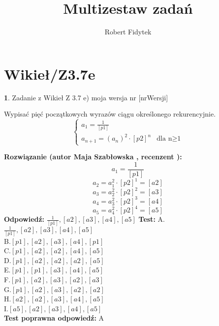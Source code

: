 \documentclass[12pt, a4paper]{article}
\title{Multizestaw zadań}
\author{Robert Fidytek}
\date{}
\theoremstyle{definition} %
\newtheorem{zad}{}
\newcommand{\kategoria}[1]{\section{#1}} %
\newcommand{\zadStart}[1]{\begin{zad}#1\newline} %
\newcommand{\zadStop}{\end{zad}}   %
\newcommand{\rozwStart}[2]{\noindent \textbf{Rozwiązanie (autor #1 , recenzent #2): }\newline} %
\newcommand{\rozwStop}{\newline}                                            %
\newcommand{\odpStart}{\noindent \textbf{Odpowiedź:}\newline}    %
\newcommand{\odpStop}{\newline}                                             %
\newcommand{\testStart}{\noindent \textbf{Test:}\newline} %
\newcommand{\testStop}{\newline} %
\newcommand{\kluczStart}{\noindent \textbf{Test poprawna odpowiedź:}\newline} %
\newcommand{\kluczStop}{\newline} %
\begin{document}
\maketitle


\kategoria{Wikieł/Z3.7e}
\zadStart{Zadanie z Wikieł Z 3.7 e)  moja wersja nr [nrWersji]}

Wypisać pięć początkowych wyrazów ciągu określonego rekurencyjnie.
$$\left\{ \begin{array}{ll}
a_{1}=\frac{1}{[p1]}\\
a_{n+1}=(a_{n})^{2}\cdot[p2]^{n}& \textrm{dla n$\geq$1} 
\end{array} \right.
$$
\zadStop
\rozwStart{Maja Szabłowska}{}
$$a_{1}=\frac{1}{[p1]}$$
$$a_{2}=a_{1}^{2}\cdot [p2]^{1}=[a2]$$
$$a_{3}=a_{2}^{2}\cdot [p2]^{2}=[a3]$$
$$a_{4}=a_{3}^{2}\cdot [p2]^{3}=[a4]$$
$$a_{5}=a_{4}^{2}\cdot [p2]^{4}=[a5]$$
\rozwStop
\odpStart
$\frac{1}{[p1]},[a2],[a3],[a4],[a5]$
\odpStop
\testStart
A.$\frac{1}{[p1]},[a2],[a3],[a4],[a5]$\\
B.$[p1],[a2],[a3],[a4],[p1]$\\
C.$[p1],[a2],[a2],[a4],[a5]$\\
D.$[p1],[a2],[a2],[a2],[a5]$\\
E.$[p1],[p1],[a3],[a4],[a5]$\\
F.$[p1],[a2],[a3],[a2],[a3]$\\
G.$[p1],[a2],[a3],[a2],[a2]$\\
H.$[a2],[a2],[a3],[a4],[a5]$\\
I.$[a5],[a2],[a3],[a4],[a5]$\\
\testStop
\kluczStart
A
\kluczStop
\end{document}
